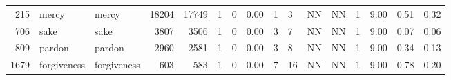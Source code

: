 \begin{table}[ht]
\begin{tabular}{rllrrrrrllllrrrr}
  215 & mercy & mercy & 18204 & 17749 &   1 &   0 & 0.00 & 1 & 3 & NN & NN &   1 & 9.00 & 0.51 & 0.32 \\ 
  706 & sake & sake & 3807 & 3506 &   1 &   0 & 0.00 & 3 & 7 & NN & NN &   1 & 9.00 & 0.07 & 0.06 \\ 
  809 & pardon & pardon & 2960 & 2581 &   1 &   0 & 0.00 & 3 & 8 & NN & NN &   1 & 9.00 & 0.34 & 0.13 \\ 
  1679 & forgiveness & forgiveness & 603 & 583 &   1 &   0 & 0.00 & 7 & 16 & NN & NN &   1 & 9.00 & 0.78 & 0.20 \\ 
   \hline
\end{tabular}
\end{table}
